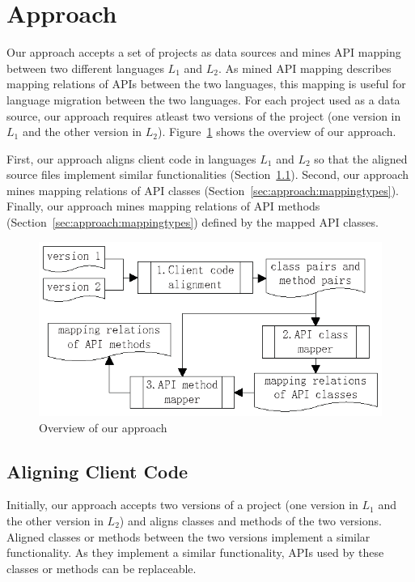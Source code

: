 \section{Approach}
\label{sec:approach}

Our approach accepts a set of projects as data sources and mines
API mapping between two different languages $L_1$ and $L_2$.
As mined API mapping describes mapping relations of APIs between
the two languages, this mapping is useful for language migration between the two languages.
For each project used as a data source, our approach requires
atleast two versions of the project (one version in $L_1$ and
the other version in $L_2$). Figure~\ref{fig:approach} shows
the overview of our approach.

First, our approach aligns client code in languages $L_1$ and $L_2$
so that the aligned source files implement similar functionalities
(Section~\ref{sec:approach:acc}). Second, our approach mines
mapping relations of API classes (Section~\ref{sec:approach:mappingtypes}).
Finally, our approach mines mapping relations of API
methods (Section~\ref{sec:approach:mappingtypes}) defined by the mapped
API classes.

\begin{figure}[t]
\centering
\includegraphics[scale=1,clip]{figure/approach.eps}\vspace*{-3ex}
 \caption{Overview of our approach}\vspace*{-3.5ex}
 \label{fig:approach}
\end{figure}

\subsection{Aligning Client Code}
\label{sec:approach:acc}

Initially, our approach accepts two versions of a project (one version in
$L_1$ and the other version in $L_2$) and aligns classes and methods
of the two versions. Aligned classes or methods
between the two versions implement a similar functionality. As they
implement a similar functionality, APIs used by these classes or methods can be
replaceable.

